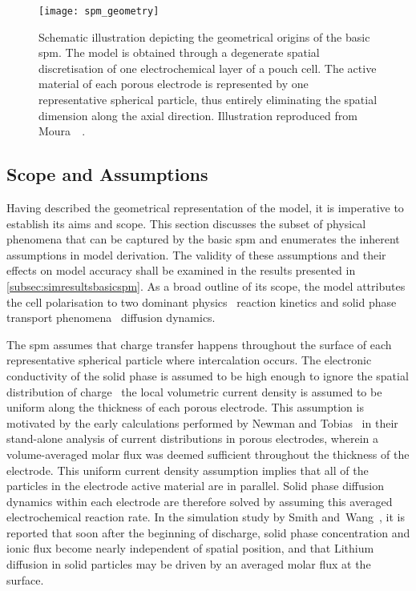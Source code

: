 \begin{figure}[!htbp]
    \centering
    \texttt{[image: spm\_geometry]}
    \caption[Schematic illustration depicting geometrical origins of the
    ]
    {%
        Schematic illustration depicting the geometrical origins of the basic
        \gls{spm}. The model is obtained through a degenerate spatial
        discretisation of one electrochemical layer of a  pouch cell.  The
        active material of each porous electrode is represented by one
        representative spherical particle, thus entirely eliminating the spatial
        dimension along the axial direction. Illustration reproduced
        from Moura~\etal~\cite{Moura2012}.
    }%
    \label{fig:sandwichtospm}
\end{figure}

\subsection{Scope and Assumptions}\label{subsec:basicspmassumptions}

Having described the  geometrical representation of the model,  it is imperative
to establish its  aims and scope. This section discusses  the subset of physical
phenomena  that can  be  captured  by the  basic  \gls{spm}  and enumerates  the
inherent assumptions in model derivation.  The validity of these assumptions and
their effects  on model accuracy shall  be examined in the  results presented in
\cref{subsec:simresultsbasicspm}. As  a broad  outline of  its scope,  the model
attributes the cell polarisation to two dominant physics \viz~reaction kinetics
and solid phase transport phenomena \ie~diffusion dynamics.


The  \gls{spm}  assumes that  charge  transfer  happens throughout  the  surface
of  each  representative  spherical  particle where  intercalation  occurs.  The
electronic  conductivity of  the solid  phase is  assumed to  be high  enough to
ignore the  spatial distribution  of charge \ie~the local  volumetric current
density is assumed  to be uniform along the thickness  of each porous electrode.
This assumption is  motivated by the early calculations performed  by Newman and
Tobias~\cite{Newman1962} in their stand-alone  analysis of current distributions
in porous electrodes, wherein a volume-averaged molar flux was deemed sufficient
throughout  the  thickness  of  the  electrode.  This  uniform  current  density
assumption implies  that all of the  particles in the electrode  active material
are  in parallel.  Solid  phase  diffusion dynamics  within  each electrode  are
therefore solved by assuming this averaged electrochemical reaction rate. In the
simulation study  by Smith and~Wang~\cite{Smith2006},  it is reported  that soon
after  the beginning  of discharge,  solid  phase concentration  and ionic  flux
become nearly  independent of  spatial position, and  that Lithium  diffusion in
solid particles may be driven by an averaged molar flux at the surface.


